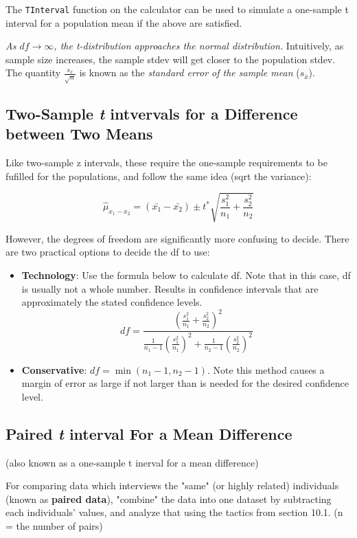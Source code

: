 \documentclass[12pt, a4paper]{article}
\theoremstyle{definition}
\begin{document}
The \verb|TInterval| function on the calculator can be used to simulate a one-sample t interval for a population mean if the above are satisfied.

\textit{As $df \rightarrow \infty$, the t-distribution approaches the normal distribution.}
Intuitively, as sample size increases, the sample stdev will get closer to the population stdev.
The quantity $\frac{s_x}{\sqrt{n}}$ is known as the \textit{standard error of the sample mean} ($s_{\bar{x}}$).

\subsection{Two-Sample \textit{t} intvervals for a Difference between Two Means}

Like two-sample z intervals, these require the one-sample requirements to be fufilled for the populations, and follow the same idea (sqrt the variance):

\[\hat{\mu}_{x_1 - x_2} = (\bar{x_1} - \bar{x_2}) \pm t^{*}\sqrt{\frac{s_1^2}{n_1}+\frac{s_2^2}{n_2}}\]

However, the degrees of freedom are significantly more confusing to decide. There are two practical options to decide the df to use:
\begin{itemize}
    \item \textbf{Technology}: Use the formula below to calculate df. Note that in this case, df is usually not a whole number.
    Results in confidence intervals that are approximately the stated confidence levels.
    \[df = \frac{{(\frac{s_1^2}{n_1} + \frac{s_2^2}{n_2})}^2}{\frac{1}{n_1 - 1} {(\frac{s_1^2}{n_1})}^2 + \frac{1}{n_2 - 1} {(\frac{s_2^2}{n_2})}^2}\] %

    \item \textbf{Conservative}: $df = \min{(n_1 - 1, n_2 - 1)}$.
    Note this method causes a margin of error as large if not larger than is needed for the desired confidence level.
\end{itemize}

\subsection{Paired \textit{t} interval For a Mean Difference}
(also known as a one-sample t inerval for a mean difference)

For comparing data which interviews the "same" (or highly related) individuals (known as \textbf{paired data}), "combine" the data into one dataset by subtracting each individuals' values, and analyze that using the tactics from section 10.1.
(n = the number of pairs)
\end{document}
